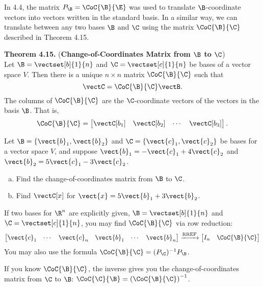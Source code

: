 \begin{boxdef}
	In 4.4, the matrix $P_\B=\CoC{\B}{\E}$ was used to translate $\B$-coordinate vectors into vectors written in the standard basis. In a similar way, we can translate between any two bases $\B$ and $\C$ using the matrix $\CoC{\B}{\C}$ described in Theorem 4.15.
\end{boxdef}
\vspace{-1em}
\begin{boxthm}
	\textbf{Theorem 4.15.} 
	(\textbf{Change-of-Coordinates Matrix from $\boldsymbol{\B}$ to $\boldsymbol{\C}$}) \\
	Let $\B=\vectset[b]{1}{n}$ and $\C=\vectset[c]{1}{n}$ be bases of a vector space $V$. Then there is a unique $n\times n$ matrix $\CoC{\B}{\C}$ such that
	$$ \vectC = \CoC{\B}{\C}\vectB. $$
	The columns of $\CoC{\B}{\C}$ are the $\C$-coordinate vectors of the vectors in the basis $\B$. That is,
	$$ \CoC{\B}{\C} = \begin{bmatrix}\vectC[b_1]&\vectC[b_2]&\cdots&\vectC[b_3]\end{bmatrix}.$$
\end{boxthm}


\begin{exercise} %
	Let $\B=\{\vect{b}_1,\vect{b}_2\}$ and $\C=\{\vect{c}_1,\vect{c}_2\}$ be bases for a vector space $V$, and suppose $\vect{b}_1=-\vect{c}_1+4\vect{c}_2$ and $\vect{b}_2=5\vect{c}_1-3\vect{c}_2$.
	\begin{multicols}{2}
		\begin{enumerate}[(a)]
			\item Find the change-of-coordinates matrix from $\B$ to $\C$.
			\item Find $\vectC[x]$ for $\vect{x}=5\vect{b}_1+3\vect{b}_2$.
		\end{enumerate}
	\end{multicols}
\end{exercise}
\vfill


\newpage

\begin{boxme}
	If two bases for $\R^n$ are explicitly given, $\B=\vectset[b]{1}{n}$ and $\C=\vectset[c]{1}{n}$, you may find $\CoC{\B}{\C}$ via row reduction:
	$$\begin{bmatrix}\vect{c}_1&\cdots&\vect{c}_n&\vect{b}_1&\cdots&\vect{b}_n\end{bmatrix} \xrightarrow{\text{RREF}} \begin{bmatrix}I_n&\CoC{\B}{\C}\end{bmatrix}$$
	You may also use the formula $\CoC{\B}{\C}=(P_\C)^{-1}P_\B$.
	
	If you know $\CoC{\B}{\C}$, the inverse gives you the change-of-coordinates matrix from $\C$ to $\B$: $\CoC{\C}{\B} = \left(\CoC{\B}{\C}\right)^{-1}$.
\end{boxme}


